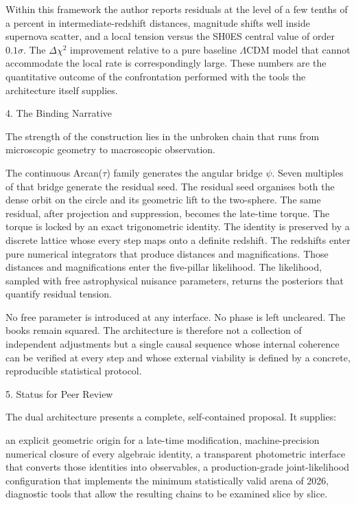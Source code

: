 Within this framework the author reports residuals at the level of a few tenths of a percent in intermediate-redshift distances, magnitude shifts well inside supernova scatter, and a local tension versus the SH0ES central value of order \(0.1\sigma\). The \(\Delta\chi^2\) improvement relative to a pure baseline \(\Lambda\)CDM model that cannot accommodate the local rate is correspondingly large. These numbers are the quantitative outcome of the confrontation performed with the tools the architecture itself supplies.

4. The Binding Narrative

The strength of the construction lies in the unbroken chain that runs from microscopic geometry to macroscopic observation.  

The continuous Arcan(\(\tau\)) family generates the angular bridge \(\psi\).  
Seven multiples of that bridge generate the residual seed.  
The residual seed organises both the dense orbit on the circle and its geometric lift to the two-sphere.  
The same residual, after projection and suppression, becomes the late-time torque.  
The torque is locked by an exact trigonometric identity.  
The identity is preserved by a discrete lattice whose every step maps onto a definite redshift.  
The redshifts enter pure numerical integrators that produce distances and magnifications.  
Those distances and magnifications enter the five-pillar likelihood.  
The likelihood, sampled with free astrophysical nuisance parameters, returns the posteriors that quantify residual tension.

No free parameter is introduced at any interface. No phase is left uncleared. The books remain squared. The architecture is therefore not a collection of independent adjustments but a single causal sequence whose internal coherence can be verified at every step and whose external viability is defined by a concrete, reproducible statistical protocol.

5. Status for Peer Review

The dual architecture presents a complete, self-contained proposal. It supplies:

an explicit geometric origin for a late-time modification,  
machine-precision numerical closure of every algebraic identity,  
a transparent photometric interface that converts those identities into observables,  
a production-grade joint-likelihood configuration that implements the minimum statistically valid arena of 2026,  
diagnostic tools that allow the resulting chains to be examined slice by slice.

